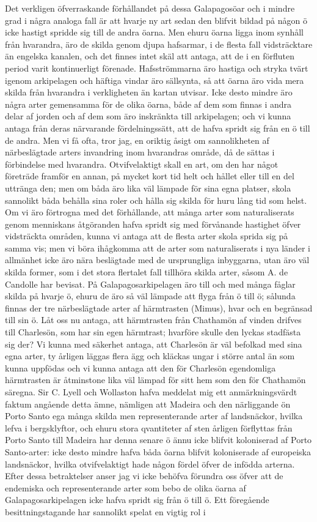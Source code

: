 Det verkligen öfverraskande förhållandet på dessa Galapagosöar och i mindre grad i några analoga fall är att hvarje ny art sedan den blifvit bildad på någon ö icke hastigt spridde sig till de andra öarna. Men ehuru öarna ligga inom synhåll från hvarandra, äro de skilda genom djupa hafsarmar, i de flesta fall vidsträcktare än engelska kanalen, och det finnes intet skäl att antaga, att de i en förfluten period varit kontinuerligt förenade. Hafsströmmarna äro hastiga och stryka tvärt igenom arkipelagen och häftiga vindar äro sällsynta, så att öarna äro vida mera skilda från hvarandra i verkligheten än kartan utvisar. Icke desto mindre äro några arter gemensamma för de olika öarna, både af dem som finnas i andra delar af jorden och af dem som äro inskränkta till arkipelagen; och vi kunna antaga från deras närvarande fördelningssätt, att de hafva spridt sig från en ö till de andra. Men vi få ofta, tror jag, en oriktig åsigt om sannolikheten af närbeslägtade arters invandring inom hvarandras område, då de sättas i förbindelse med hvarandra. Otvifvelaktigt skall en art, om den har något företräde framför en annan, på mycket kort tid helt och hållet eller till en del uttränga den; men om båda äro lika väl lämpade för sina egna platser, skola sannolikt båda behålla sina roler och hålla sig skilda för huru lång tid som helst. Om vi äro förtrogna med det förhållande, att många arter som naturaliserats genom menniskans åtgöranden hafva spridt sig med förvånande hastighet öfver vidsträckta områden, kunna vi antaga att de flesta arter skola sprida sig på samma vis; men vi böra ihågkomma att de arter som naturaliserats i nya länder i allmänhet icke äro nära beslägtade med de ursprungliga inbyggarna, utan äro väl skilda former, som i det stora flertalet fall tillhöra skilda arter, såsom A. de Candolle har bevisat. På Galapagosarkipelagen äro till och med många fåglar skilda på hvarje ö, ehuru de äro så väl lämpade att flyga från ö till ö; sålunda finnas der tre närbeslägtade arter af härmtrasten (Mimus), hvar och en begränsad till sin ö. Låt oss nu antaga, att härmtrasten från Chathamön af vinden drifves till Charlesön, som har sin egen härmtrast; hvarföre skulle den lyckas stadfästa sig der? Vi kunna med säkerhet antaga, att Charlesön är väl befolkad med sina egna arter, ty årligen läggas flera ägg och kläckas ungar i större antal än som kunna uppfödas och vi kunna antaga att den för Charlesön egendomliga härmtrasten är åtminstone lika väl lämpad för sitt hem som den för Chathamön säregna. Sir C. Lyell och Wollaston hafva meddelat mig ett anmärkningsvärdt faktum angående detta ämne, nämligen att Madeira och den närliggande ön Porto Santo ega många skilda men representerande arter af landsnäckor, hvilka lefva i bergsklyftor, och ehuru stora qvantiteter af sten årligen förflyttas från Porto Santo till Madeira har denna senare ö ännu icke blifvit koloniserad af Porto Santo-arter: icke desto mindre hafva båda öarna blifvit koloniserade af europeiska landsnäckor, hvilka otvifvelaktigt hade någon fördel öfver de infödda arterna. Efter dessa betraktelser anser jag vi icke behöfva förundra oss öfver att de endemiska och representerande arter som bebo de olika öarna af Galapagosarkipelagen icke hafva spridt sig från ö till ö. Ett föregående besittningstagande har sannolikt spelat en vigtig rol i 